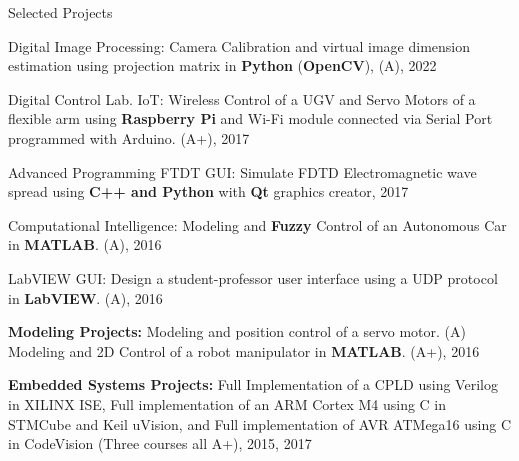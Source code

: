 \begin{cventries}
 
  \cventry
    {} %
    {Selected Projects} %
    {} %
    {} %
    {
      \begin{cvitems} %
        \item{Digital Image Processing: Camera Calibration and virtual image dimension estimation using projection matrix in \textbf{Python} (\textbf{OpenCV}), (A), 2022}
            \item{Digital Control Lab. IoT: Wireless Control of a UGV and Servo Motors of a flexible arm using \textbf{Raspberry Pi} and Wi-Fi module connected via Serial Port programmed with Arduino. (A+), 2017}
            \item{Advanced Programming FTDT GUI: Simulate FDTD Electromagnetic wave spread using \textbf{C++ and Python} with \textbf{Qt} graphics creator, 2017}
            \item{Computational Intelligence: Modeling and \textbf{Fuzzy} Control of an Autonomous Car in \textbf{MATLAB}. (A), 2016}
            \item{LabVIEW GUI: Design a student-professor user interface using a UDP protocol in \textbf{LabVIEW}. (A), 2016}
            \item{\textbf{Modeling Projects:} Modeling and position control of a servo motor. (A)\\ Modeling and 2D Control of a robot manipulator in \textbf{MATLAB}. (A+), 2016}
            \item{\textbf{Embedded Systems Projects:} Full Implementation of a CPLD using Verilog in XILINX ISE, Full implementation of an ARM Cortex M4 using C in STMCube and Keil uVision, and Full implementation of  AVR ATMega16 using C in CodeVision (Three courses all A+), 2015, 2017}
      \end{cvitems}
    }
    
\end{cventries}
